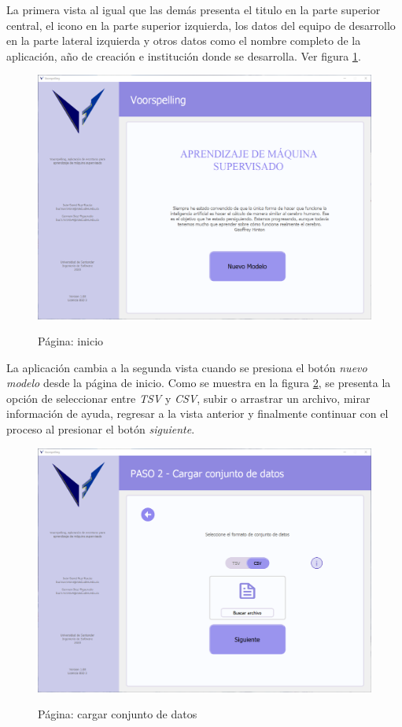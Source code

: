 La primera vista al igual que las demás presenta el titulo en la parte superior central, el icono en la parte superior izquierda, los datos del equipo de desarrollo en la parte lateral izquierda y otros datos como el nombre completo de la aplicación, año de creación e institución donde se desarrolla. Ver figura \ref{fig:home}.

\begin{figure}[H]
    \centering
    \caption{Página: inicio}
    \includegraphics[width=\textwidth]{views/home.png}
    \label{fig:home}
\end{figure}

La aplicación cambia a la segunda vista cuando se presiona el botón \textit{nuevo modelo} desde la página de inicio. Como se muestra en la figura \ref{fig:loaddataset}, se presenta la opción de seleccionar entre \textit{TSV} y \textit{CSV}, subir o arrastrar un archivo, mirar información de ayuda, regresar a la vista anterior y finalmente continuar con el proceso al presionar el botón \textit{siguiente}.

\begin{figure}[H]
    \centering
    \caption{Página: cargar conjunto de datos}
    \includegraphics[width=\textwidth]{views/load_dataset.png}
    \label{fig:loaddataset}
\end{figure}

